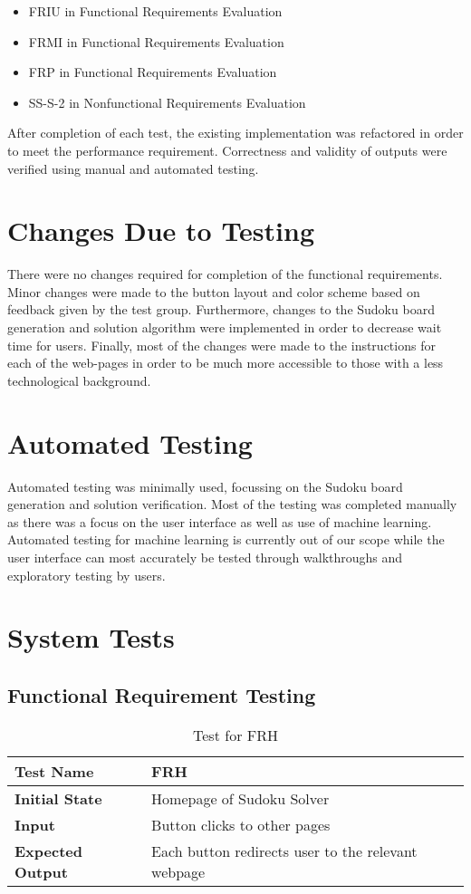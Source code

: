 \documentclass[11pt]{article}
\begin{document}
\begin{itemize}
    \item FRIU in Functional Requirements Evaluation
    \item FRMI in Functional Requirements Evaluation
    \item FRP in Functional Requirements Evaluation
    \item SS-S-2 in Nonfunctional Requirements Evaluation
\end{itemize}

After completion of each test, the existing implementation was refactored in order to meet the performance requirement. Correctness and validity of outputs were verified using manual and automated testing.

\section{Changes Due to Testing}
There were no changes required for completion of the functional requirements. Minor changes were made to the button layout and color scheme based on feedback given by the test group. Furthermore, changes to the Sudoku board generation and solution algorithm were implemented in order to decrease wait time for users. Finally, most of the changes were made to the instructions for each of the web-pages in order to be much more accessible to those with a less technological background.

\section{Automated Testing}
Automated testing was minimally used, focussing on the Sudoku board generation and solution verification. Most of the testing was completed manually as there was a focus on the user interface as well as use of machine learning. Automated testing for machine learning is currently out of our scope while the user interface can most accurately be tested through walkthroughs and exploratory testing by users.

\section{System Tests}

\subsection{Functional Requirement Testing}
\begin{table}[H]
\centering
\begin{tabularx}{\textwidth}{p{5cm}X}
\hline
\textbf{Test Name}       &  FRH\\ \hline
\textbf{Initial State}   &  Homepage of Sudoku Solver\\ \hline
\textbf{Input}           &  Button clicks to other pages\\ \hline
\textbf{Expected Output} &  Each button redirects user to the relevant webpage\\ \hline
\end{tabularx}
\caption{Test for FRH}
\end{table}
\end{document}
